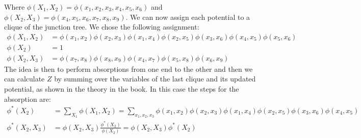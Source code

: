 \documentclass[11pt,a4paper,oneside]{report}
\begin{document}
	
Where $\phi(X_1,X_2) = \phi(x_1,x_2,x_3,x_4,x_5,x_6)$ and $\phi(X_2,X_3) = \phi(x_4,x_5,x_6,x_7,x_8,x_9)$. We can now assign each potential to a clique of the junction tree. We chose the following assignment:
\begin{align*}
\phi(X_1,X_2) &= \phi(x_1,x_2)\phi(x_2,x_3)\phi(x_1,x_4)\phi(x_2,x_5)\phi(x_3,x_6)\phi(x_4,x_5)\phi(x_5,x_6)\\
\phi(X_2) &= 1\\
\phi(X_2,X_3) &= \phi(x_7,x_8)\phi(x_8,x_9)\phi(x_4,x_7)\phi(x_5,x_8)\phi(x_6,x_9)
\end{align*}
The idea is then to perform absorptions from one end to the other and then we can calculate $Z$ by summing over the variables of the last clique and its updated potential, as shown in the theory in the book. In this case the steps for the absorption are:
\begin{align*}
\phi^\ast(X_2) &= \sum_{X_1}\phi(X_1,X_2) = \sum_{x_1,x_2,x_3}\phi(x_1,x_2)\phi(x_2,x_3)\phi(x_1,x_4)\phi(x_2,x_5)\phi(x_3,x_6)\phi(x_4,x_5)\\
\phi^\ast(X_2,X_3) &= \phi(X_2,X_3)\frac{\phi^\ast(X_2)}{\phi(X_2)}=\phi(X_2,X_3)\phi^\ast(X_2)
\end{align*}
\end{document}
